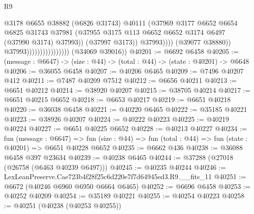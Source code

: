 \begin{lexlean}{R9}
\begin{coremodule}
                                                  @3178
                                                  @6655
                                                  @38882
                                                  (@6826 @31743)
                                                  @40111
                                                  (@37969
                                                    @3177
                                                    @6652
                                                    @6654
                                                    @6825
                                                    @31743
                                                    @37981
                                                    (@37955
                                                      @3175
                                                      @113
                                                      @6652
                                                      @6652
                                                      @3174
                                                      @6497
                                                      (@37990 @3174)
                                                      @37993))
                                                  (@37997 @3173))
                                                @37993))))
                                        (@39077 @38880))
                                      @37993))))))))))))))))
      (@34069 @39016))
@40201 := @6692 @6458
@40205 := (message : @6647) -> (size : @44) -> (total : @44) -> (state : @40201) -> @6648
@40206 := @36055 @6458
@40207 := @40206 @6465
@40209 := @7496 @40207 @412
@40211 := @7487 @40209 @7512
@40212 := @6656 @40211
@40213 := @6651 @40212
@40214 := @38920 @40207
@40215 := @38705 @40214
@40217 := @6651 @40215 @6652
@40218 := @6653 @40217
@40219 := @6651 @40218
@40220 := @36038 @6458
@40221 := @40220 @6465
@40222 := @35185 @40221
@40223 := @38926 @40207
@40224 := @40222 @40223
@40225 := @40219 @40224
@40227 := @6651 @40225 @6652
@40228 := @40213 @40227
@40234 := fun (message : @6647) =>
  fun (size : @44) => fun (total : @44) => fun (state : @40201) => @6651 @40228 @6652
@40235 := @6662 @436
@40238 := @36088 @6458 @397 @23634
@40239 := @40238 @6465
@40244 := @37288 (@27018 (@26758 (@6463 @40239 @6497)))
@40245 := @40235 @40244
@40246 := LexLeanPreserve.Cae723b4f28f25c6d220e7f7d64945ed3.R9.__fits_11
@40251 := @6672 (@40246 @6960 @6950 @6664 @6465)
@40252 := @6696 @6458
@40253 := @40252 @40209
@40254 := @35189 @40221
@40255 := @40254 @40223
@40258 := @40251 (@40238 (@40253 @40255))

\end{coremodule}
\end{lexlean}
